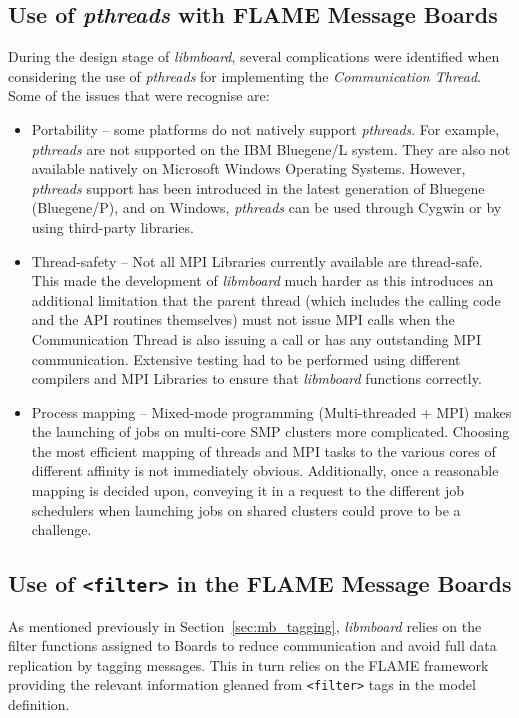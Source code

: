 \subsection{Use of \textit{pthreads} with FLAME Message Boards}

During the design stage of \textit{libmboard}, several complications were identified when considering the use of  \textit{pthreads} for implementing the \textit{Communication Thread}.  Some of the issues that were recognise are:
\begin{itemize}
\item Portability -- some platforms do not natively support \textit{pthreads}. For example, \textit{pthreads} are not supported on the IBM Bluegene/L system. They are also not available natively on Microsoft Windows Operating Systems. However, \textit{pthreads} support has been introduced in the latest generation of Bluegene (Bluegene/P), and on Windows, \textit{pthreads} can be used through Cygwin or by using third-party libraries.
\item Thread-safety -- Not all MPI Libraries currently available are thread-safe. This made the development of \textit{libmboard} much harder as this introduces an additional limitation that the parent thread (which includes the calling code and the API routines themselves) must not issue MPI calls when the Communication Thread is also issuing a call or has any outstanding MPI communication. Extensive testing had to be performed using different compilers and MPI Libraries to ensure that \textit{libmboard} functions correctly.
\item Process mapping -- Mixed-mode programming (Multi-threaded + MPI) makes the launching of jobs on multi-core SMP clusters more complicated. Choosing the most efficient mapping of threads and MPI tasks to the various cores of different affinity is not immediately obvious. Additionally, once a reasonable mapping is decided upon, conveying it in a request to the different job schedulers when launching jobs on shared clusters could prove to be a challenge.
\end{itemize} 


\subsection{Use of \texttt{<filter>} in the FLAME Message Boards}

As mentioned previously in Section~\ref{sec:mb_tagging}, \textit{libmboard} relies on the filter functions assigned to Boards to reduce communication and avoid full data replication by tagging messages. This in turn relies on the FLAME framework providing the relevant information gleaned from \texttt{<filter>} tags in the model definition.

